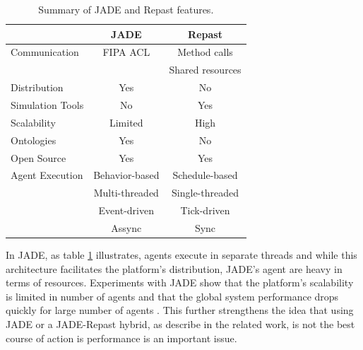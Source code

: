 \begin{table}[h]
	\caption{Summary of JADE and Repast features.}
	\label{tab:jadevsrep}
	\begin{center}
		\begin{tabular}{l|cc}
		\hline

		\hline
		\textbf{} & \textbf{JADE} & \textbf{Repast} \\ %
		\hline
			Communication & FIPA ACL &  Method calls  \\ %
						  &			 &  Shared resources \\
		\hline
			Distribution & Yes & No \\ %
		\hline
			Simulation Tools & No & Yes \\ %
		\hline
			Scalability & Limited & High \\ %
		\hline
			Ontologies & Yes & No \\ %
		\hline
			Open Source & Yes & Yes \\ %
		\hline
			Agent Execution & Behavior-based & Schedule-based  \\ %
							& Multi-threaded & Single-threaded \\ %
							& Event-driven   & Tick-driven 	   \\ %
							& Assync		 & Sync 		   \\ %
		\hline
		\end{tabular}
	\end{center}
\end{table}

In JADE, as table \ref{tab:jadevsrep} illustrates, agents execute in separate threads and while this architecture facilitates the platform's distribution, JADE's agent are heavy in terms of resources. Experiments with JADE show that the platform's scalability is limited in number of agents and that the global system performance drops quickly for large number of agents \cite{mengistu2008scalability} \cite{garcia2011misia}. This further strengthens the idea that using JADE or a JADE-Repast hybrid, as describe in the related work, is not the best course of action is performance is an important issue.

